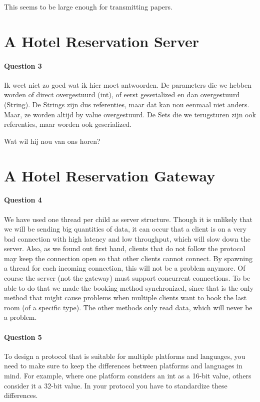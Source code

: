 \documentclass[a4paper,10pt]{article}
\begin{document}
This seems to be large enough for transmitting papers.


\section{A Hotel Reservation Server}
\paragraph{Question 3}
Ik weet niet zo goed wat ik hier moet antwoorden. De parameters die we hebben worden of direct overgestuurd (int), of eerst geserialized en dan overgestuurd (String). De Strings zijn dus referenties, maar dat kan nou eenmaal niet anders. Maar, ze worden altijd by value overgestuurd. De Sets die we terugsturen zijn ook referenties, maar worden ook geserialized.

Wat wil hij nou van ons horen?

\section{A Hotel Reservation Gateway}
\paragraph{Question 4}
We have used one thread per child as server structure. Though it is unlikely that we will be sending big quantities of data, it can occur that a client is on a very bad connection with high latency and low throughput, which will slow down the server. Also, as we found out first hand, clients that do not follow the protocol may keep the connection open so that other clients cannot connect. By spawning a thread for each incoming connection, this will not be a problem anymore. Of course the server (not the gateway) must support concurrent connections. To be able to do that we made the booking method synchronized, since that is the only method that might cause problems when multiple clients want to book the last room (of a specific type). The other methods only read data, which will never be a problem.

\paragraph{Question 5}
To design a protocol that is suitable for multiple platforms and languages, you need to make sure to keep the differences between platforms and languages in mind. For example, where one platform considers an int as a 16-bit value, others consider it a 32-bit value. In your protocol you have to standardize these differences.
\end{document}
